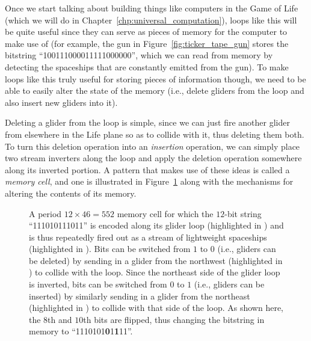Once we start talking about building things like computers in the Game of Life (which we will do in Chapter~\ref{chp:universal_computation}), loops like this will be quite useful since they can serve as pieces of memory for the computer to make use of (for example, the gun in Figure~\ref{fig:ticker_tape_gun} stores the bitstring ``100111000011111000000'', which we can read from memory by detecting the spaceships that are constantly emitted from the gun). To make loops like this truly useful for storing pieces of information though, we need to be able to easily alter the state of the memory (i.e., delete gliders from the loop and also insert new gliders into it).

Deleting a glider from the loop is simple, since we can just fire another glider from elsewhere in the Life plane so as to collide with it, thus deleting them both. To turn this deletion operation into an \emph{insertion} operation, we can simply place two stream inverters along the loop and apply the deletion operation somewhere along its inverted portion. A pattern that makes use of these ideas is called a \emph{memory cell}, and one is illustrated in Figure~\ref{fig:p46_memory_cell} along with the mechanisms for altering the contents of its memory.

\begin{figure}[!htb]
	\centering
	\caption{A period $12 \times 46 = 552$ memory cell for which the $12$-bit string ``111010111011'' is encoded along its glider loop (highlighted in ) and is thus repeatedly fired out as a stream of lightweight spaceships (highlighted in ). Bits can be switched from $1$ to $0$ (i.e., gliders can be deleted) by sending in a glider from the northwest (highlighted in ) to collide with the loop. Since the northeast side of the glider loop is inverted, bits can be switched from $0$ to $1$ (i.e., gliders can be inserted) by similarly sending in a glider from the northeast (highlighted in ) to collide with that side of the loop. As shown here, the $8$th and $10$th bits are flipped, thus changing the bitstring in memory to ``1110101\textbf{0}1\textbf{1}11''.}\label{fig:p46_memory_cell}
\end{figure}


